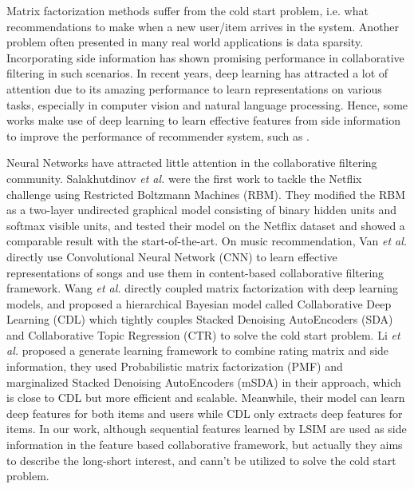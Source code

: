 \documentclass{sig-alternate-05-2015}
\begin{document}
Matrix factorization methods suffer from the cold start problem,
i.e. what recommendations to make when a new user/item arrives in the system.
Another problem often presented in many real world applications is data sparsity.
Incorporating side information has shown promising performance
in collaborative filtering in such scenarios.
In recent years, deep learning \cite{hinton2006reducing, hinton2006fast}
has attracted a lot of attention due to its amazing performance
to learn representations on various tasks,
especially in computer vision and natural language processing.
Hence, some works make use of deep learning to learn effective
features from side information to improve the performance of recommender system,
such as \cite{salakhutdinov2007restricted, van2013deep, wang2015collaborative, li2015deep}.

Neural Networks have attracted little attention in the collaborative filtering community.
Salakhutdinov \textit{et al.} \cite{salakhutdinov2007restricted} were the first
work to tackle the Netflix challenge using Restricted Boltzmann Machines (RBM).
They modified the RBM as a two-layer undirected graphical model
consisting of binary hidden units and softmax visible units,
and tested their model on the Netflix dataset and
showed a comparable result with the start-of-the-art.
On music recommendation, Van \textit{et al.} \cite{van2013deep}
directly use Convolutional Neural Network (CNN) to learn effective representations
of songs and use them in content-based collaborative filtering framework.
Wang \textit{et al.} \cite{wang2015collaborative} 
directly coupled matrix factorization with deep learning models,
and proposed a hierarchical Bayesian model called Collaborative Deep Learning (CDL)
which tightly couples Stacked Denoising AutoEncoders (SDA) \cite{vincent2008extracting} and
Collaborative Topic Regression (CTR) \cite{wang2011collaborative} to solve the cold start problem.
Li \textit{et al.} \cite{li2015deep} proposed a generate learning framework
to combine rating matrix and side information, they used 
Probabilistic matrix factorization (PMF) \cite{salakhutdinov2011probabilistic} and
marginalized Stacked Denoising AutoEncoders (mSDA) \cite{chen2012marginalized}
in their approach, which is close to CDL but more efficient and scalable.
Meanwhile, their model can learn deep features for both items and users
while CDL only extracts deep features for items.
In our work, although sequential features learned by LSIM are used as side information
in the feature based collaborative framework, but actually they aims to describe
the long-short interest, and cann't be utilized to solve the cold start problem.
\end{document}
